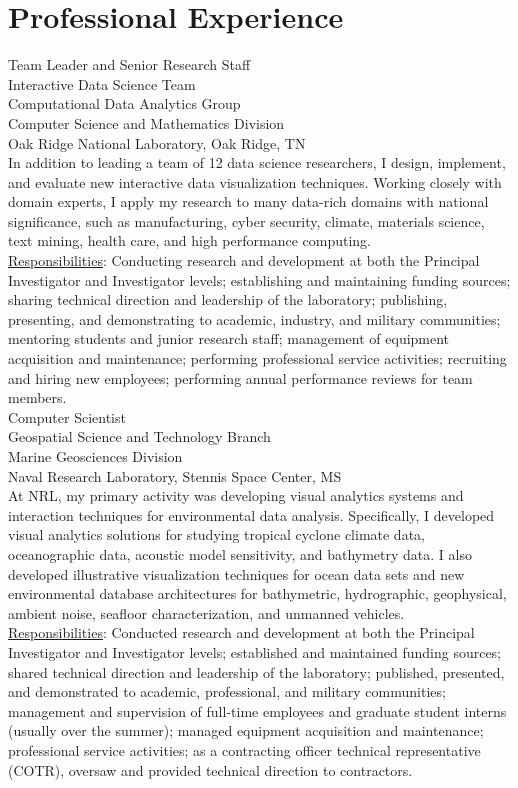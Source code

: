 \documentclass[11pt, letterpaper]{article}
\newcommand{\years}[1]{\marginnote{\scriptsize #1}}
\begin{document}
\section*{Professional Experience}
\noindent\years{2010--present}Team Leader and Senior Research Staff\\
Interactive Data Science Team\\
Computational Data Analytics Group\\
Computer Science and Mathematics Division\\
Oak Ridge National Laboratory, Oak Ridge, TN\\[.2cm]
In addition to leading a team of 12 data science
researchers, I design, implement, and evaluate new interactive data
visualization techniques.  Working closely with domain experts, I apply my
research to many data-rich domains with national significance, such as
manufacturing, cyber security, climate, materials science, text
mining, health care, and high performance computing.\\
\underline{Responsibilities}: Conducting research and
development at both the Principal Investigator and Investigator levels;
establishing and maintaining funding sources; sharing technical direction and
leadership of the laboratory; publishing, presenting, and demonstrating to
academic, industry, and military communities; mentoring students and junior
research staff; management of equipment acquisition and maintenance;
performing professional service activities; recruiting and hiring new
employees; performing annual performance reviews for team members.\\

\years{2001-2010}Computer Scientist\\
Geospatial Science and Technology Branch\\
Marine Geosciences Division\\
Naval Research Laboratory, Stennis Space Center, MS\\[.2cm]
At NRL, my primary activity was developing visual analytics systems and
interaction techniques for environmental data analysis.  Specifically, I
developed visual analytics solutions for studying tropical cyclone climate
data, oceanographic data, acoustic model sensitivity, and bathymetry data.  I
also developed illustrative visualization techniques for ocean data sets and
new environmental database architectures for bathymetric, hydrographic,
geophysical, ambient noise, seafloor characterization, and unmanned vehicles.\\
\underline{Responsibilities}:  Conducted research and development at both the
Principal Investigator and Investigator levels; established and maintained
funding sources; shared technical direction and leadership of the
laboratory; published, presented, and demonstrated to academic, professional,
and military communities; management and supervision of full-time employees
and graduate student interns (usually over the summer); managed equipment
acquisition and maintenance; professional service activities; as a contracting
officer technical representative (COTR), oversaw and provided technical
direction to contractors.\\
\end{document}
